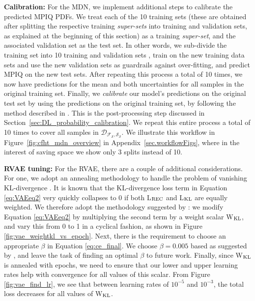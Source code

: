 {\bf Calibration:} For the MDN, we implement additional steps to calibrate the predicted MPIQ PDFs. We treat each of the 10 training sets (these are obtained after splitting the respective training {\it super-sets} into training and validation sets, as explained at the beginning of this section) as a training {\it super-set}, and the associated validation set as the test set. In other words, we sub-divide the training set into 10 training and validation sets , train on the new training data sets and use the new validation sets as guardrails against over-fitting, and predict MPIQ on the new test sets. After repeating this process a total of 10 times, we now have predictions for the mean and both uncertainties for all samples in the original training set. Finally, we {\it calibrate} our model's predictions on the original test set by using the predictions on the original training set, by following the method described in \cite{crude_probability_calibration}. This is the post-processing step discussed in Section~\ref{sec:DL_probability_calibration}. We repeat this entire process a total of 10 times to cover all samples in $\mathcal{D_{F_S,S_S}}$. We illustrate this workflow in Figure~\ref{fig:cfht_mdn_overview} in Appendix~\ref{sec.workflowFigs}, where in the interest of saving space we show only 3 splits instead of 10.

{\bf RVAE tuning:} For the RVAE, there are a couple of additional considerations. For one, we adopt an annealing methodology to handle the problem of vanishing KL-divergence \citep{cyclical_wkl_annealing}. It is known that the KL-divergence loss term in Equation \ref{eq:VAEeq2} very quickly collapses to 0 if both L$_{\rm REC}$ and L$_{\rm KL}$ are equally weighted. We therefore adopt the methodology suggested by \cite{cyclical_wkl_annealing}: we modify Equation \ref{eq:VAEeq2} by multiplying the second term by a weight scalar W$_{\rm KL}$, and vary this from 0 to 1 in a cyclical fashion, as shown in Figure \ref{fig:vae_weightkl_vs_epoch}. Next, there is the requirement to choose an appropriate $\beta$ in Equation \ref{eq:ce_final}. We choose $\beta=0.005$ based as suggested by \cite{rvae_orig}, and leave the task of finding an optimal $\beta$ to future work. %
Finally, since W$_{\rm KL}$ is annealed with epochs, we need to ensure that our lower and upper learning rates help with convergence for all values of this scalar. From Figure \ref{fig:vae_find_lr}, we see that between learning rates of $10^{-5}$ and $10^{-3}$, the total loss decreases for all values of W$_{\rm KL}$. %

